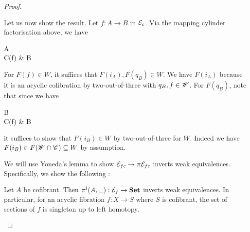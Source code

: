 \documentclass[./main.tex]{subfiles}
\begin{document}
\begin{proof}
\begin{lem}
\begin{proof1}
      Let us now show the result.
      Let $f : A \to B$ in $\mathcal{E}_c$.
      Via the mapping cylinder factorisation above,
      we have 
      \begin{cd}
        A \\
        {C(f)} & B
        \arrow["f", from=1-1, to=2-2]
        \arrow["{i_A}"', tail, from=1-1, to=2-1]
        \arrow["{q_B}"', from=2-1, to=2-2]
      \end{cd}
      For $F(f) \in W$, it suffices that $F(i_A), F(q_B) \in W$.
      We have $F(i_A)$ because it is an acyclic cofibration by
      two-out-of-three with $q_B, f \in \mathscr{W}$.
      For $F(q_B)$, note that since we have 
      \begin{cd}
        B \\
        {C(f)} & B
        \arrow["{\id{}}", from=1-1, to=2-2]
        \arrow["{i_B}"', "{\sim}", tail, from=1-1, to=2-1]
        \arrow["{q_B}"', from=2-1, to=2-2]
      \end{cd}
      it suffices to show that $F(i_B) \in W$
      by two-out-of-three for $W$.
      Indeed we have $F(i_B) \in F(\mathscr{W} \cap \mathscr{C}) \subseteq W$ by assumption.
    \end{proof1}
  \end{lem}
  We will use Yoneda's lemma to show $\mathcal{E}_{fc} \to \pi\mathcal{E}_{fc}$ inverts
  weak equivalences.
  Specifically, we show the following : 
  \begin{lem}

    Let $A$ be cofibrant.
    Then $\pi^l(A , \_) : \mathcal{E}_f \to \mathbf{Set}$ inverts weak equivalences.
    In particular, for an acyclic fibration $f : X \to S$
    where $S$ is cofibrant, the set of sections of $f$
    is singleton up to left homotopy.

    \begin{proof1}
      

\end{proof1}
\end{lem}
\end{proof}
\end{document}
